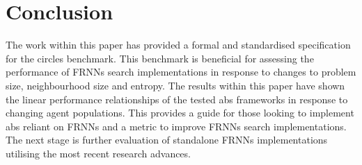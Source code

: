\vspace{-0.3cm}
\section{Conclusion\label{sec:conclusion}}
\vspace{-0.3cm}
  The work within this paper has provided a formal and standardised specification for the circles benchmark. This benchmark is beneficial for assessing the performance of FRNNs search implementations in response to changes to problem size, neighbourhood size and entropy. The results within this paper have shown the linear performance relationships of the tested \gls{abs} frameworks in response to changing agent populations. This provides a guide for those looking to implement \gls{abs} reliant on FRNNs and a metric to improve FRNNs search implementations. The next stage is further evaluation of standalone FRNNs implementations utilising the most recent research advances.
